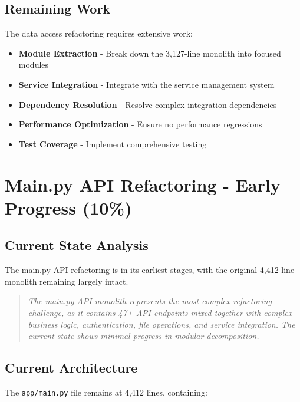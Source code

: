 \documentclass[11pt]{article}
\begin{document}
\subsection{Remaining Work}

The data access refactoring requires extensive work:

\begin{itemize}
\item \textbf{Module Extraction} - Break down the 3,127-line monolith into focused modules
\item \textbf{Service Integration} - Integrate with the service management system
\item \textbf{Dependency Resolution} - Resolve complex integration dependencies
\item \textbf{Performance Optimization} - Ensure no performance regressions
\item \textbf{Test Coverage} - Implement comprehensive testing
\end{itemize}

\section{Main.py API Refactoring - Early Progress (10\%)}

\subsection{Current State Analysis}

The main.py API refactoring is in its earliest stages, with the original 4,412-line monolith remaining largely intact.

\begin{quote}
\emph{The main.py API monolith represents the most complex refactoring challenge, as it contains 47+ API endpoints mixed together with complex business logic, authentication, file operations, and service integration. The current state shows minimal progress in modular decomposition.}
\end{quote}

\subsection{Current Architecture}

The \texttt{app/main.py} file remains at 4,412 lines, containing:
\end{document}
